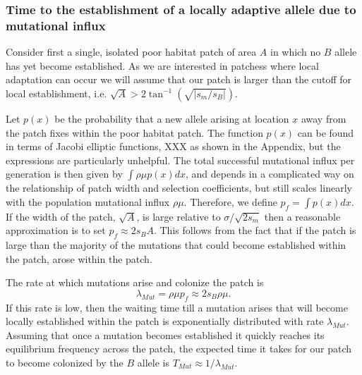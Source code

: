\documentclass{article}
\begin{document}

\subsubsection{Time to the establishment of a locally adaptive allele
  due to mutational influx}
\label{ss:patchymutation}
Consider first a single, isolated poor habitat patch of area $A$ in
which no $B$ allele has yet become established. As
we are interested in patchess where local adaptation can occur we will assume
that our patch is larger than the cutoff for local
establishment, i.e. $\sqrt{A} > 2 \tan^{-1} (\sqrt{|s_m/s_B|})$.

Let $p(x)$ be the probability that a new allele arising at location
$x$ away from the patch fixes within the poor habitat patch.
The function $p(x)$ can be found in terms of Jacobi elliptic functions,
XXX as shown in the Appendix, but the expressions are particularly unhelpful.
The total successful mutational influx per generation is then given by $\int \rho \mu p(x) dx$,
and depends in a complicated way on the relationship of patch width and selection coefficients,
but still scales linearly with the population mutational influx $\rho \mu$.
Therefore, we define $p_f = \int p(x) dx$.  If the width of the patch, $\sqrt{A}$, is large
relative to $\sigma/\sqrt{2s_m}$ then a reasonable approximation is to
set $p_f \approx 2 s_B A$. This follows from the fact that if the
patch is large than the majority of the mutations that could become
established within the patch, arose within the patch.  

The rate at which mutations arise and colonize the patch is
\begin{equation}
\lambda_{Mut} = \rho \mu p_f \approx 2 s_B \rho \mu.
\end{equation}
If this rate is low,  then the waiting time till a mutation arises that
will become locally established within the patch is exponentially
distributed with rate $\lambda_{Mut}$.  Assuming that once a mutation
becomes established it quickly reaches its equilibrium frequency across the patch, the
 expected time it takes for our patch to become colonized by the $B$
 allele is $T_{Mut} \approx 1/ \lambda_{Mut} $.
\end{document}
